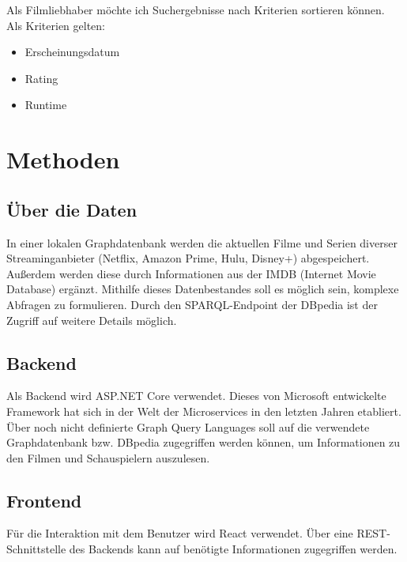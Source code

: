 \documentclass[conference]{IEEEtran}
\begin{document}
Als Filmliebhaber möchte ich Suchergebnisse nach Kriterien sortieren können.
\\
Als Kriterien gelten:

\begin{itemize}
	\item Erscheinungsdatum
	\item Rating
	\item Runtime
\end{itemize}

\section{Methoden}

\subsection*{Über die Daten}

In einer lokalen Graphdatenbank werden die aktuellen Filme und Serien diverser Streaminganbieter (Netflix, Amazon Prime, Hulu, Disney+) abgespeichert. Außerdem werden diese durch Informationen aus der IMDB (Internet Movie Database) ergänzt. Mithilfe dieses Datenbestandes soll es möglich sein, komplexe Abfragen zu formulieren. Durch den SPARQL-Endpoint der DBpedia ist der Zugriff auf weitere Details möglich.

\subsection*{Backend}

Als Backend wird ASP.NET Core verwendet. Dieses von Microsoft entwickelte Framework hat sich in der Welt der Microservices in den letzten Jahren etabliert. Über noch nicht definierte Graph Query Languages soll auf die verwendete Graphdatenbank bzw. DBpedia zugegriffen werden können, um Informationen zu den Filmen und Schauspielern auszulesen.

\subsection*{Frontend}

Für die Interaktion mit dem Benutzer wird React verwendet. Über eine REST-Schnittstelle des Backends kann auf benötigte Informationen zugegriffen werden.

\end{document}
